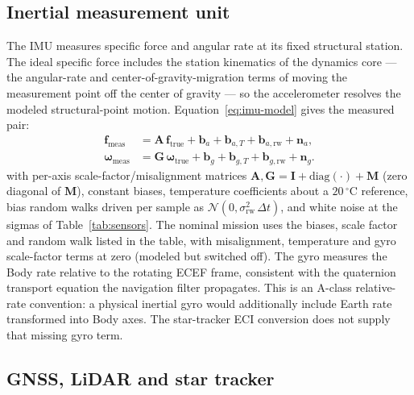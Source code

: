\subsection{Inertial measurement unit}

The \ac{IMU} measures specific force and angular rate at its fixed
structural station. The ideal specific force includes the station
kinematics of the dynamics core --- the angular-rate and
center-of-gravity-migration terms of moving the measurement point off the
center of gravity --- so the accelerometer resolves the modeled structural-point motion. Equation~\eqref{eq:imu-model} gives the measured pair:
%
\begin{equation}
\label{eq:imu-model}
\begin{aligned}
\mathbf{f}_{\mathrm{meas}} &= \mathbf{A}\,\mathbf{f}_{\mathrm{true}}
+ \mathbf{b}_a + \mathbf{b}_{a,T} + \mathbf{b}_{a,\mathrm{rw}} + \mathbf{n}_a,\\
\boldsymbol{\omega}_{\mathrm{meas}} &= \mathbf{G}\,\boldsymbol{\omega}_{\mathrm{true}}
+ \mathbf{b}_g + \mathbf{b}_{g,T} + \mathbf{b}_{g,\mathrm{rw}} + \mathbf{n}_g.
\end{aligned}
\end{equation}
%
with per-axis scale-factor/misalignment matrices
$\mathbf{A},\mathbf{G} = \mathbf{I} + \mathrm{diag}(\cdot) + \mathbf{M}$
(zero diagonal of $\mathbf{M}$), constant biases, temperature coefficients
about a $20\,^{\circ}\mathrm{C}$ reference, bias random walks driven per
sample as $\mathcal{N}(0, \sigma_{\mathrm{rw}}^2\,\Delta t)$, and white
noise at the sigmas of Table~\ref{tab:sensors}. The nominal mission uses
the biases, scale factor and random walk listed in the table, with
misalignment, temperature and gyro scale-factor terms at zero (modeled
but switched off). The gyro measures the Body rate relative to the
rotating \ac{ECEF} frame, consistent with the quaternion transport
equation the navigation filter propagates. This is an A-class relative-rate convention: a physical inertial gyro would additionally include Earth rate transformed into Body axes. The star-tracker ECI conversion does not supply that missing gyro term.

\subsection{GNSS, LiDAR and star tracker}

